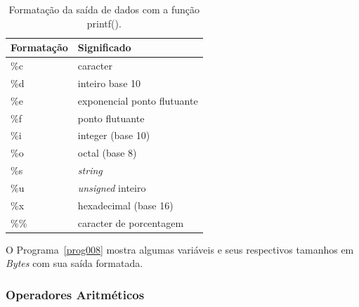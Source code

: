 \documentclass[11pt,fleqn]{book} %
\begin{document}
\begin{table}[ht]
	\centering
	\caption{Formatação da saída de dados com a função printf().}
	\label{tab:printf}
		\begin{tabular}{@{}ll@{}}
			\toprule
			Formatação & Significado                        \\ \midrule
			\%c        & caracter                           \\
			\%d        & inteiro  base 10                   \\
			\%e        & exponencial ponto flutuante        \\
			\%f        & ponto flutuante                    \\
			\%i        & integer (base 10)                  \\
			\%o        & octal (base 8)                     \\
			\%s        & \textit{string}                    \\
			\%u        & \textit{unsigned} inteiro          \\
			\%x        & hexadecimal (base 16)              \\
			\%\%       & caracter de porcentagem            \\ \bottomrule
		\end{tabular}%
\end{table}

O Programa~\ref{prog008}  mostra algumas variáveis e seus respectivos tamanhos em \textit{Bytes} com sua saída formatada.



\subsubsection{Operadores Aritméticos}
\end{document}
